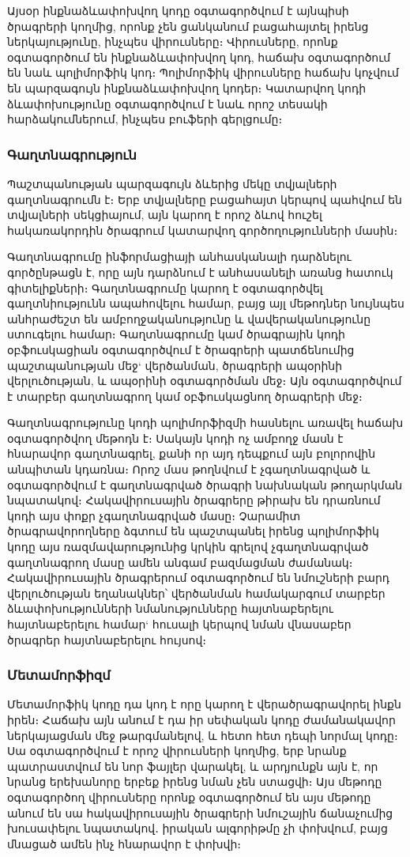 \documentclass[12pt]{article}
\begin{document}
\begin{sloppypar}
	Այսօր ինքնաձևափոխվող կոդը օգտագործվում է այնպիսի ծրագրերի կողմից,
	որոնք չեն ցանկանում բացահայտել իրենց ներկայությունը, ինչպես վիրուսները։
	Վիրուսները, որոնք օգտագործում են ինքնաձևափոխվող կոդ, հաճախ օգտագործում են
	նաև պոլիմորֆիկ կոդ։ Պոլիմորֆիկ վիրուսները հաճախ կոչվում են պարզագույն
	ինքնաձևափոխվող կոդեր։ Կատարվող կոդի ձևափոխությունը օգտագործվում է նաև
	որոշ տեսակի հարձակումներում, ինչպես բուֆերի գերլցումը։

\subsubsection{Գաղտնագրություն}
	Պաշտպանության պարզագույն ձևերից մեկը տվյալների գաղտնագրումն է։
	Երբ տվյալները բացահայտ կերպով պահվում են տվյալների սեկցիայում, այն կարող է
	որոշ ձևով հուշել հակառակորդին ծրագրում կատարվող գործողությունների մասին։

	Գաղտնագրումը ինֆորմացիայի անհասկանալի դարձնելու գործընթացն է, որը այն
	դարձնում է անհասանելի առանց հատուկ գիտելիքների։ Գաղտնագրումը կարող է
	օգտագործվել գաղտնիությունն ապահովելու համար, բայց այլ մեթոդներ նույնպես
	անհրաժեշտ են ամբողջականությունը և վավերականությունը ստուգելու համար։
	Գաղտնագրումը կամ ծրագրային կոդի օբֆուսկացիան օգտագործվում է ծրագրերի
	պատճենումից պաշտպանության մեջ` վերծանման, ծրագրերի ապօրինի վերլուծության,
	և ապօրինի օգտագործման մեջ։ Այն օգտագործվում է տարբեր գաղտնագրող կամ
	օբֆուսկացնող ծրագրերի մեջ։

	Գաղտնագրությունը կոդի պոլիմորֆիզմի հասնելու առավել հաճախ օգտագործվող
	մեթոդն է։ Սակայն կոդի ոչ ամբողջ մասն է հնարավոր գաղտնագրել, քանի որ այդ
	դեպքում այն բոլորովին անպիտան կդառնա։ Որոշ մաս թողնվում է չգաղտնագրված
	և օգտագործվում է գաղտնագրված ծրագրի նախնական թողարկման նպատակով։
	Հակավիրուսային ծրագրերը թիրախ են դրառնում կոդի այս փոքր չգաղտնագրված մասը։
	Չարամիտ ծրագրավորողները ձգտում են պաշտպանել իրենց պոլիմորֆիկ կոդը այս
	ռազմավարությունից կրկին գրելով չգաղտնագրված գաղտնագրող մասը ամեն անգամ
	բազմացման ժամանակ։ Հակավիրուսային ծրագրերում օգտագործում են նմուշների բարդ
	վերլուծության եղանակներ՝ վերծանման համակարգում տարբեր ձևափոխությունների
	նմանությունները հայտնաբերելու հայտնաբերելու համար` հուսալի կերպով նման
	վնասաբեր ծրագրեր հայտնաբերելու հույսով։
	
\subsubsection{Մետամորֆիզմ}
	Մետամորֆիկ կոդը դա կոդ է որը կարող է վերածրագրավորել ինքն իրեն։ Հաճախ
	այն անում է դա իր սեփական կոդը ժամանակավոր ներկայացման մեջ թարգմանելով,
	և հետո հետ դեպի նորմալ կոդը։ Սա օգտագործվում է որոշ վիրուսների կողմից, երբ
	նրանք պատրաստվում են նոր ֆայլեր վարակել, և արդյունքն այն է, որ նրանց
	երեխանորը երբեք իրենց նման չեն ստացվի։ Այս մեթոդը օգտագործող վիրուսները
	որոնք օգտագործում են այս մեթոդը անում են սա հակավիրուսային ծրագրերի
	նմուշային ճանաչումից խուսափելու նպատակով․ իրական ալգորիթմը չի փոխվում,
	բայց մնացած ամեն ինչ հնարավոր է փոխվի։


\end{sloppypar}
\end{document}
